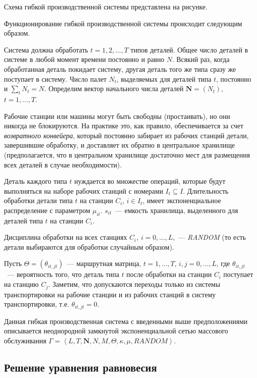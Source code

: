 \documentclass[a4paper,14pt]{extarticle}
\theoremstyle{note}
\begin{document}
Схема гибкой производственной системы представлена на рисунке.

Функционирование гибкой производственной системы происходит следующим образом.

Система должна обработать $t=1,2,...,T$ типов деталей. Общее число деталей в системе в любой момент времени постоянно и равно $N$. Всякий раз, когда обработанная деталь покидает систему, другая деталь того же типа сразу же поступает в систему. Число палет $N_t$, выделяемых для деталей типа $t$, постоянно и $\sum\limits_t N_t = N$. Определим вектор начального числа деталей $\mathbf{N}=(N_t)$, $t=1,...,T$.

Рабочие станции или машины могут быть свободны (простаивать), но они никогда не блокируются. На практике это, как правило, обеспечивается за счет \textit{возвратного конвейера}, который постоянно забирает из рабочих станций детали, завершившие обработку, и доставляет их обратно в центральное хранилище (предполагается, что в центральном хранилище достаточно мест для размещения всех деталей в случае необходимости).

Деталь каждого типа $t$ нуждается во множестве операций, которые будут выполняться на наборе рабочих станций с номерами $I_t \subseteq I$. Длительность обработки детали типа $t$ на станции $C_i$, $i \in I_t$, имеет экспоненциальное распределение с параметром $\mu_{it}$. $s_{it}$~--- емкость хранилища, выделенного для деталей типа $t$ на станции $C_i$.

Дисциплина обработки на всех станциях $C_i,~i=0,...,L$,~--- \textit{RANDOM} (то есть детали выбираются для обработки случайным образом). 

Пусть $\Theta = (\theta_{it,jt})$~--- маршрутная матрица, $t=1,...,T$, $i,j=0,...,L$, где $\theta_{it,jt}$~--- вероятность того, что деталь типа $t$ после обработки на станции $C_i$ поступает на станцию $C_j$. Заметим, что допускаются переходы только из системы транспортировки на рабочие станции и из рабочих станций в систему транспортировки, т.е. $\theta_{it,jt}=0$.

Данная гибкая производственная система с введенными выше предположениями описывается неоднородной замкнутой экспоненциальной сетью массового обслуживания $\Gamma=\left<L,T,\mathbf{N},N,M,\Theta,\kappa,\mu,\textit{RANDOM}\right>$.

\subsection{Решение уравнения равновесия}
\label{subsec:solution}
\end{document}
